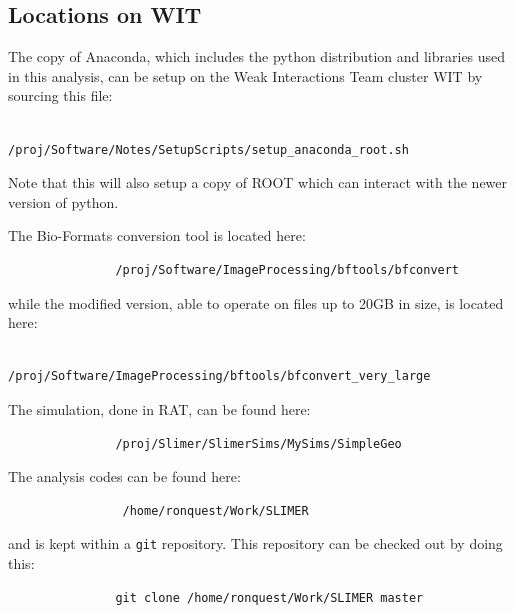 \documentclass[11pt]{article}
\begin{document}
\subsection{Locations on WIT}
The copy of Anaconda, which includes the python distribution and libraries used in this analysis, can be setup on the Weak Interactions Team cluster WIT by sourcing this file:
\begin{verbatim}
                /proj/Software/Notes/SetupScripts/setup_anaconda_root.sh
\end{verbatim}
Note that this will also setup a copy of ROOT which can interact with the newer version of python. 

The Bio-Formats conversion tool is located here:
\begin{verbatim}
               /proj/Software/ImageProcessing/bftools/bfconvert
\end{verbatim}
while the modified version, able to operate on files up to 20GB in size, is located here:
\begin{verbatim}
               /proj/Software/ImageProcessing/bftools/bfconvert_very_large
\end{verbatim}

The simulation, done in RAT, can be found here:
\begin{verbatim}
               /proj/Slimer/SlimerSims/MySims/SimpleGeo
\end{verbatim}

The analysis codes can be found here:
\begin{verbatim}
                /home/ronquest/Work/SLIMER
\end{verbatim}
and is kept within a \verb+git+ repository. This repository can be checked out by doing this:
\begin{verbatim}
               git clone /home/ronquest/Work/SLIMER master
\end{verbatim}
\end{document}
